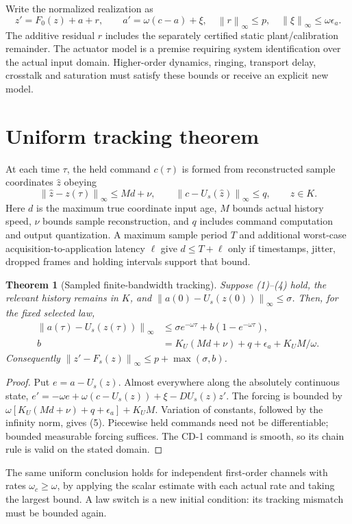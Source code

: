 \documentclass[10pt,a4paper]{article}
\newcommand{\norm}[1]{\left\|#1\right\|_\infty}
\newtheorem{theorem}{Theorem}
\begin{document}
Write the normalized realization as
\begin{equation}
z'=F_0(z)+a+r,\qquad
a'=\omega(c-a)+\xi,\quad
\norm{r}\leq p,\quad \norm{\xi}\leq\omega\epsilon_a .
\end{equation}
The additive residual $r$ includes the separately certified static plant/calibration remainder. The actuator model is a premise requiring system identification over the actual input domain. Higher-order dynamics, ringing, transport delay, crosstalk and saturation must satisfy these bounds or receive an explicit new model.
\newpage
\section{Uniform tracking theorem}
At each time $\tau$, the held command $c(\tau)$ is formed from reconstructed sample coordinates $\widehat z$ obeying
\begin{equation}
\norm{\widehat z-z(\tau)}\leq M d+\nu,\qquad
\norm{c-U_s(\widehat z)}\leq q,\qquad \widehat z\in K .
\end{equation}
Here $d$ is the maximum true coordinate input age, $M$ bounds actual history speed, $\nu$ bounds sample reconstruction, and $q$ includes command computation and output quantization. A maximum sample period $T$ and additional worst-case acquisition-to-application latency $\ell$ give $d\leq T+\ell$ only if timestamps, jitter, dropped frames and holding intervals support that bound.

\begin{theorem}[Sampled finite-bandwidth tracking]
Suppose (1)--(4) hold, the relevant history remains in $K$, and
$\norm{a(0)-U_s(z(0))}\leq\sigma$. Then, for the fixed selected law,
\begin{equation}
\begin{split}
\norm{a(\tau)-U_s(z(\tau))}
&\leq \sigma e^{-\omega\tau}+b(1-e^{-\omega\tau}),\\
b&=K_U(Md+\nu)+q+\epsilon_a+K_UM/\omega .
\end{split}
\end{equation}
Consequently $\norm{z'-F_s(z)}\leq p+\max(\sigma,b)$.
\end{theorem}
\begin{proof}
Put $e=a-U_s(z)$. Almost everywhere along the absolutely continuous state,
$e'=-\omega e+\omega(c-U_s(z))+\xi-DU_s(z)z'$.
The forcing is bounded by
$\omega[K_U(Md+\nu)+q+\epsilon_a]+K_UM$.
Variation of constants, followed by the infinity norm, gives (5). Piecewise held commands need not be differentiable; bounded measurable forcing suffices. The CD-1 command is smooth, so its chain rule is valid on the stated domain.
\end{proof}
The same uniform conclusion holds for independent first-order channels with rates $\omega_c\geq\omega$, by applying the scalar estimate with each actual rate and taking the largest bound. A law switch is a new initial condition: its tracking mismatch must be bounded again.
\end{document}
